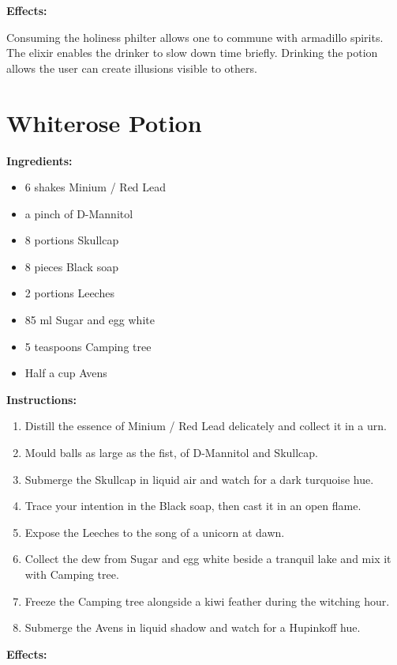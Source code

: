 \documentclass{article}
\begin{document}
\textbf{Effects:}

Consuming the holiness philter allows one to commune with armadillo spirits. The elixir enables the drinker to slow down time briefly. Drinking the potion allows the user can create illusions visible to others.

\newpage
\section*{Whiterose Potion}

\textbf{Ingredients:}

\begin{itemize}
  \item 6 shakes Minium / Red Lead
  \item a pinch of D-Mannitol
  \item 8 portions Skullcap
  \item 8 pieces Black soap
  \item 2 portions Leeches
  \item 85 ml Sugar and egg white
  \item 5 teaspoons Camping tree
  \item Half a cup Avens
\end{itemize}

\textbf{Instructions:}

\begin{enumerate}
  \item Distill the essence of Minium / Red Lead delicately and collect it in a urn.
  \item Mould balls as large as the fist, of D-Mannitol and Skullcap.
  \item Submerge the Skullcap in liquid air and watch for a dark turquoise hue.
  \item Trace your intention in the Black soap, then cast it in an open flame.
  \item Expose the Leeches to the song of a unicorn at dawn.
  \item Collect the dew from Sugar and egg white beside a tranquil lake and mix it with Camping tree.
  \item Freeze the Camping tree alongside a kiwi feather during the witching hour.
  \item Submerge the Avens in liquid shadow and watch for a Hupinkoff hue.
\end{enumerate}

\textbf{Effects:}
\end{document}
